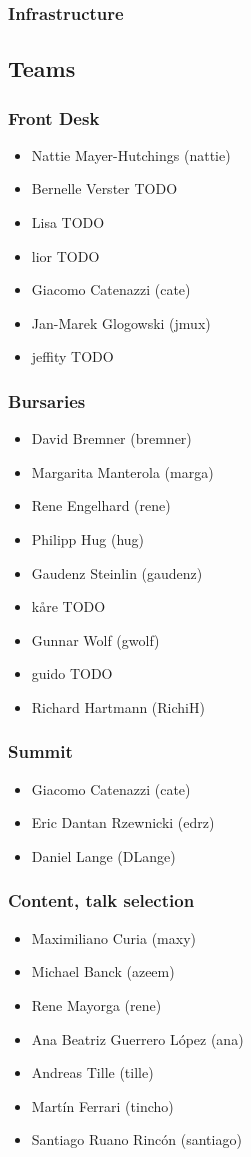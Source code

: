 \documentclass[t]{beamer}
\begin{document}
\begin{frame}
	\frametitle{Infrastructure}
\end{frame}

\subsection{Teams}

\begin{frame}
	\frametitle{Front Desk}
	\begin{itemize}
		\item Nattie Mayer-Hutchings (nattie)
		\item Bernelle Verster TODO
		\item Lisa TODO
		\item lior TODO
		\item Giacomo Catenazzi (cate)
		\item Jan-Marek Glogowski (jmux)
		\item jeffity TODO
	\end{itemize}
\end{frame}

\begin{frame}
	\frametitle{Bursaries}
	\begin{itemize}
		\item David Bremner (bremner)
		\item Margarita Manterola (marga)
		\item Rene Engelhard (rene)
		\item Philipp Hug (hug)
		\item Gaudenz Steinlin (gaudenz)
		\item kåre TODO
		\item Gunnar Wolf (gwolf)
		\item guido TODO
		\item Richard Hartmann (RichiH)
	\end{itemize}
\end{frame}

\begin{frame}
	\frametitle{Summit}
	\begin{itemize}
		\item Giacomo Catenazzi (cate)
		\item Eric Dantan Rzewnicki (edrz)
		\item Daniel Lange (DLange)
	\end{itemize}
\end{frame}

\begin{frame}
	\frametitle{Content, talk selection}
	\begin{itemize}
		\item Maximiliano Curia (maxy)
		\item Michael Banck (azeem)
		\item Rene Mayorga (rene)
		\item Ana Beatriz Guerrero López (ana)
		\item Andreas Tille (tille)
		\item Martín Ferrari (tincho)
		\item Santiago Ruano Rincón (santiago)
	\end{itemize}
\end{frame}
\end{document}
